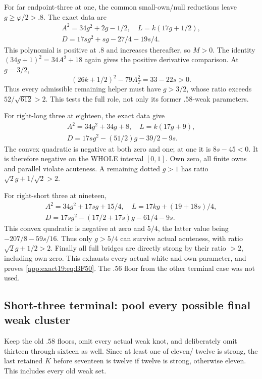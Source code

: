 For far endpoint-three at one,
the common small-own/null
reductions leave \(g\ge\varphi/2>.8\).
The exact data are
\[
\begin{gathered}
 A^2=34g^2+2g-1/2,\quad L=k(17g+1/2),\\
                   D=17sg^2+sg-27/4-19s/4 .
\end{gathered}
\]
This polynomial is positive at
\(.8\) and increases thereafter,
so \(M>0\).
The identity
\((34g+1)^2=34A^2+18\)
again gives the positive derivative
comparison.
At \(g=3/2\),
\[
                         (26k+1/2)^2-79A_T^2=33-22s>0 .
\]
Thus every admissible remaining
helper must have \(g>3/2\),
whose ratio exceeds
\(52/\sqrt{612}>2\).
This tests the full role, not
only its former \(.58\)-weak
parameters.

For right-long three at eighteen,
the exact data give
\[
\begin{gathered}
 A^2=34g^2+34g+8,\quad L=k(17g+9),\\
                   D=17sg^2-(51/2)g-39/2-9s .
\end{gathered}
\]
The convex quadratic is negative
at both zero and one; at one
it is \(8s-45<0\).
It is therefore negative on the
WHOLE interval \([0,1]\).
Own zero, all finite owns and
parallel violate acuteness.
A remaining dotted \(g>1\)
has ratio \(\sqrt2g+1/\sqrt2>2\).

For right-short three at nineteen,
\[
\begin{gathered}
 A^2=34g^2+17sg+15/4,\quad
 L=17kg+(19+18s)/4,\\
                   D=17sg^2-(17/2+17s)g-61/4-9s .
\end{gathered}
\]
This convex quadratic is negative
at zero and \(5/4\), the latter
value being \(-207/8-59s/16\).
Thus only \(g>5/4\) can survive
actual acuteness, with ratio
\(\sqrt2g+1/2>2\).
Finally all full bridges are
directly strong by their ratio
\(>2\), including own zero.
This exhausts every actual white
and own parameter, and proves
\eqref{app:exact19:eq:BF50}.
The \(.56\) floor from the other
terminal case was not used.

\subsection{Short-three terminal: pool every possible final weak cluster}
\label{app:exact19:Bshortthreefinish}

Keep the old \(.58\) floors,
omit every actual weak knot,
and deliberately omit thirteen
through sixteen as well.
Since at least one of eleven/
twelve is strong, the last
retained \(K\) before seventeen
is twelve if twelve is strong,
otherwise eleven.
This includes every old weak set.

